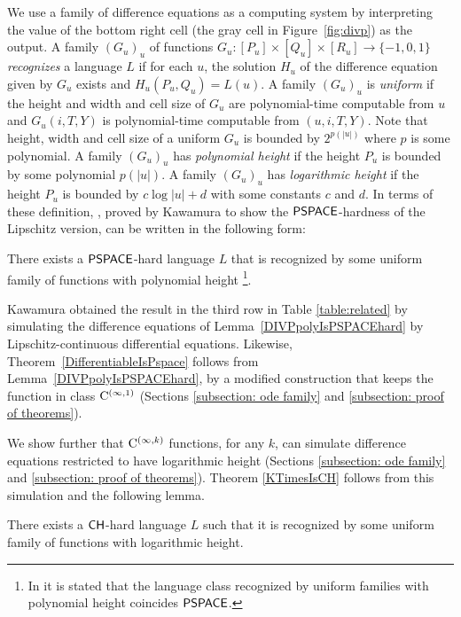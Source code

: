 We use a family of difference equations as a computing system by
interpreting the value of the bottom right cell (the gray cell in Figure~\ref{fig:divp}) as the output. 
A family $(G_u)_u$ of functions 
$G_u \colon [P_u] \times [Q_u] \times [R_u] \to \{-1, 0, 1\}$
\emph{recognizes} a language $L$ if for each $u$,
the solution $H_u$ of the difference equation given by $G_u$ exists 
and $H_u(P_u, Q_u) = L(u)$.
A family $(G_u)_u$ is \emph{uniform} 
if the height and width and cell size of $G_u$ are polynomial-time computable from $u$
and $G_u(i, T, Y)$ is polynomial-time computable from $(u, i, T, Y)$.
Note that height, width and cell size of a uniform $G_u$ is bounded by $2^{p(|u|)}$ where $p$ is some polynomial.
A family $(G_u)_u$ has \emph{polynomial height} if the height $P_u$ is bounded by some polynomial $p(|u|)$.
A family $(G_u)_u$ has \emph{logarithmic height} if the height $P_u$ is bounded by $c \log |u| + d$ with some constants $c$ and $d$.
In terms of these definition,
\cite[Lemma 4.7]{kawamura2010lipschitz}, proved by Kawamura to show 
the $\mathsf{PSPACE}$-hardness of the Lipschitz version,
can be written in the following form:
\begin{lemma}
 \label{DIVPpolyIsPSPACEhard}
 There exists a $\mathsf{PSPACE}$-hard language $L$ that is recognized by some uniform family of functions with polynomial height%
 \footnote{In \cite[Lemma 4.7]{kawamura2010lipschitz}
 it is stated that the language class recognized by 
 uniform families with polynomial height coincides $\mathsf{PSPACE}$.
 }.
\end{lemma}

Kawamura obtained the result in the third row in Table \ref{table:related} 
by simulating the difference equations of Lemma~\ref{DIVPpolyIsPSPACEhard}
by Lipschitz-continuous differential equations. 
Likewise, 
Theorem~\ref{DifferentiableIsPspace} follows from Lemma~\ref{DIVPpolyIsPSPACEhard},
by a modified construction that keeps 
the function in class $\mathrm C ^{(\infty, 1)}$ 
(Sections \ref{subsection: ode family} and \ref{subsection: proof of theorems}).

We show further that $\mathrm C ^{(\infty, k)}$ functions, for any $k$, 
can simulate difference equations restricted to have logarithmic height
(Sections \ref{subsection: ode family} and \ref{subsection: proof of theorems}).
Theorem \ref{KTimesIsCH} follows from this simulation and the following lemma.
\begin{lemma}
 \label{DIVPlogIsCHhard}
 There exists a $\mathsf{CH}$-hard language $L$ such that it is recognized by some uniform family of functions with logarithmic height.
\end{lemma}

